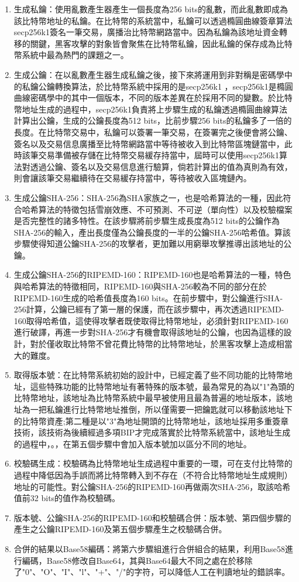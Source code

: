 			\begin{enumerate}
				\item 生成私鑰：使用亂數產生器產生一個長度為256 bits的亂數，而此亂數即成為該比特幣地址的私鑰。在比特幣的系統當中，私鑰可以透過橢圓曲線簽章算法secp256k1簽名一筆交易，廣播治比特幣網路當中。因為私鑰為該地址資金轉移的關鍵，黑客攻擊的對象皆會聚焦在比特幣私鑰，因此私鑰的保存成為比特幣系統中最為熱門的課題之一。
				\item 生成公鑰：在以亂數產生器生成私鑰之後，接下來將運用到非對稱是密碼學中的私鑰公鑰轉換算法，於比特幣系統中採用的是secp256k1
				，secp256k1是橢圓曲線密碼學中的其中一個版本，不同的版本差異在於採用不同的變數。於比特幣地址生成的過程中，secp256k1負責將上步驟生成的私鑰透過橢圓曲線算法計算出公鑰，生成的公鑰長度為512 bits，比前步驟256 bits的私鑰多了一倍的長度。在比特幣交易中，私鑰可以簽署一筆交易，在簽署完之後便會將公鑰、簽名以及交易信息廣播至比特幣網路當中等待被收入到比特幣區塊鏈當中，此時該筆交易準備被存儲在比特幣交易緩存持當中，屆時可以使用secp256k1算法對透過公鑰、簽名以及交易信息進行驗算，倘若計算出的值為真則為有效，則會讓該筆交易繼續待在交易緩存持當中，等待被收入區塊鏈內。
				\item 生成公鑰SHA-256：SHA-256為SHA家族之一，也是哈希算法的一種，因此符合哈希算法的特徵包括雪崩效應、不可預測、不可逆（單向性）以及校驗檔案是否完整性的諸多特性。在該步驟將前步驟生成長度為512 bits的公鑰作為SHA-256的輸入，產出長度僅為公鑰長度的一半的公鑰SHA-256哈希值。算該步驟使得知道公鑰SHA-256的攻擊者，更加難以用窮舉攻擊推導出該地址的公鑰。
				\item 生成公鑰SHA-256的RIPEMD-160：RIPEMD-160也是哈希算法的一種，特色與哈希算法的特徵相同，RIPEMD-160與SHA-256較為不同的部分在於RIPEMD-160生成的哈希值長度為160 bits。在前步驟中，對公鑰進行SHA-256計算，公鑰已經有了第一層的保護，而在該步驟中，再次透過RIPEMD-160取得哈希值，這使得攻擊者既使取得比特幣地址，必須針對RIPEMD-160進行破譯，再進一步對SHA-256才有機會取得該地址的公鑰，也因為這樣的設計，對於僅收取比特幣不曾花費比特幣的比特幣地址，於黑客攻擊上造成相當大的難度。
				\item 取得版本號：在比特幣系統初始的設計中，已經定義了些不同功能的比特幣地址，這些特殊功能的比特幣地址有著特殊的版本號，最為常見的為以"1"為頭的比特幣地址，該地址為比特幣系統中最早被使用且最為普遍的地址版本，該地址為一把私鑰進行比特幣地址推倒，所以僅需要一把鑰匙就可以移動該地址下的比特幣資產;第二種是以"3"為地址開頭的比特幣地址，該地址採用多重簽章技術，該技術為後續經過多項BIP才完成落實於比特幣系統當中，該地址生成的過程中，。，在第五個步驟中會加入版本號加以區分不同的地址。
				\item 校驗碼生成：校驗碼為比特幣地址生成過程中重要的一環，可在支付比特幣的過程中降低因為手誤而將比特幣轉入到不存在（不符合比特幣地址生成規則）地址的可能性。對公鑰SHA-256的RIPEMD-160再做兩次SHA-256，取該哈希值前32 bits的值作為校驗碼。
				\item 版本號、公鑰SHA-256的RIPEMD-160和校驗碼合併：版本號、第四個步驟的產生之公鑰RIPEMD-160及第五個步驟產生之校驗碼合併。
				\item 合併的結果以Base58編碼：將第六步驟組進行合併組合的結果，利用Base58進行編碼，Base58修改自Base64，其與Base64最大不同之處在於移除了"0"、"O"、"I"、"l"、"+"、"/"的字符，可以降低人工在判讀地址的錯誤率。
			\end{enumerate}


